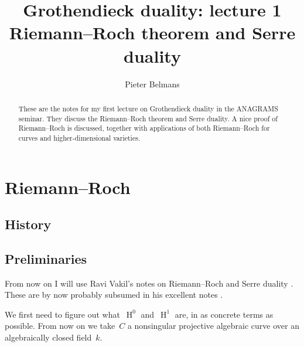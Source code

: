 \documentclass[10pt,a4paper]{article}
\title{Grothendieck duality: lecture 1 \\[.2em] \Large Riemann--Roch theorem and Serre duality}
\author{Pieter Belmans}
\theoremstyle{lecture}
\DeclareMathOperator\HH{H}
\begin{document}
\maketitle

\begin{abstract}
  These are the notes for my first lecture on Grothendieck duality in the ANAGRAMS seminar. They discuss the Riemann--Roch theorem and Serre duality. A nice proof of Riemann--Roch is discussed, together with applications of both Riemann--Roch for curves and higher-dimensional varieties.
\end{abstract}

\tableofcontents

\section{Riemann--Roch}
\label{section:riemann-roch}
\subsection{History}
\label{subsection:riemann-roch-history}

\subsection{Preliminaries}
\label{subsection:preliminaries}
From now on I will use Ravi Vakil's notes on Riemann--Roch and Serre duality \cite{vakil-proof-riemann-roch}. These are by now probably subsumed in his excellent notes \cite{vakil-math216}.

We first need to figure out what~$\HH^0$ and~$\HH^1$ are, in as concrete terms as possible. From now on we take~$C$ a nonsingular projective algebraic curve over an algebraically closed field~$k$.
\end{document}
